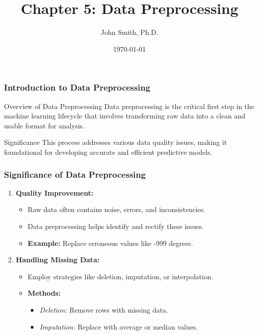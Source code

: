 \documentclass[aspectratio=169]{beamer}
\title[Chapter 5: Data Preprocessing]{Chapter 5: Data Preprocessing}
\author[J. Smith]{John Smith, Ph.D.}
\date{\today}
\begin{document}
\frame{\titlepage}

\begin{frame}[fragile]
    \frametitle{Introduction to Data Preprocessing}
    \begin{block}{Overview of Data Preprocessing}
        Data preprocessing is the critical first step in the machine learning lifecycle that involves transforming raw data into a clean and usable format for analysis.
    \end{block}
    \begin{block}{Significance}
        This process addresses various data quality issues, making it foundational for developing accurate and efficient predictive models.
    \end{block}
\end{frame}

\begin{frame}[fragile]
    \frametitle{Significance of Data Preprocessing}
    \begin{enumerate}
        \item \textbf{Quality Improvement:}
            \begin{itemize}
                \item Raw data often contains noise, errors, and inconsistencies.
                \item Data preprocessing helps identify and rectify these issues.
                \item \textbf{Example:} Replace erroneous values like -999 degrees.
            \end{itemize}

        \item \textbf{Handling Missing Data:}
            \begin{itemize}
                \item Employ strategies like deletion, imputation, or interpolation.
                \item \textbf{Methods:}
                    \begin{itemize}
                        \item \textit{Deletion:} Remove rows with missing data.
                        \item \textit{Imputation:} Replace with average or median values.
                    \end{itemize}
            \end{itemize}
    \end{enumerate}
\end{frame}
\end{document}
